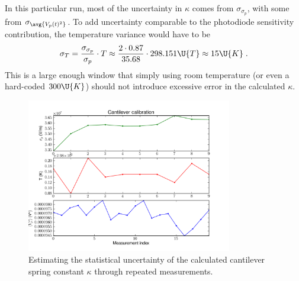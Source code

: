 In this particular run, most of the uncertainty in $\kappa$ comes from
$\sigma_{\sigma_p}$, with some from $\sigma_{\avg{V_p(t)^2}}$.  To add
uncertainty comparable to the photodiode sensitivity contribution, the
temperature variance would have to be
\begin{equation}
  \sigma_T = \frac{\sigma_{\sigma_p}}{\sigma_p}\cdot T
    \approx \frac{2\cdot 0.87}{35.68} \cdot 298.151\U{T}
    \approx 15\U{K} \;.
\end{equation}
This is a large enough window that simply using room temperature (or
even a hard-coded $300\U{K}$) should not introduce excessive error in
the calculated $\kappa$.

\begin{figure}
  \begin{center}
    \includegraphics[width=0.8\textwidth]{figures/calibcant/statistics}
    \caption{Estimating the statistical uncertainty of the calculated
      cantilever spring constant $\kappa$ through repeated
      measurements.\label{fig:calibcant:statistics}}
  \end{center}
\end{figure}

